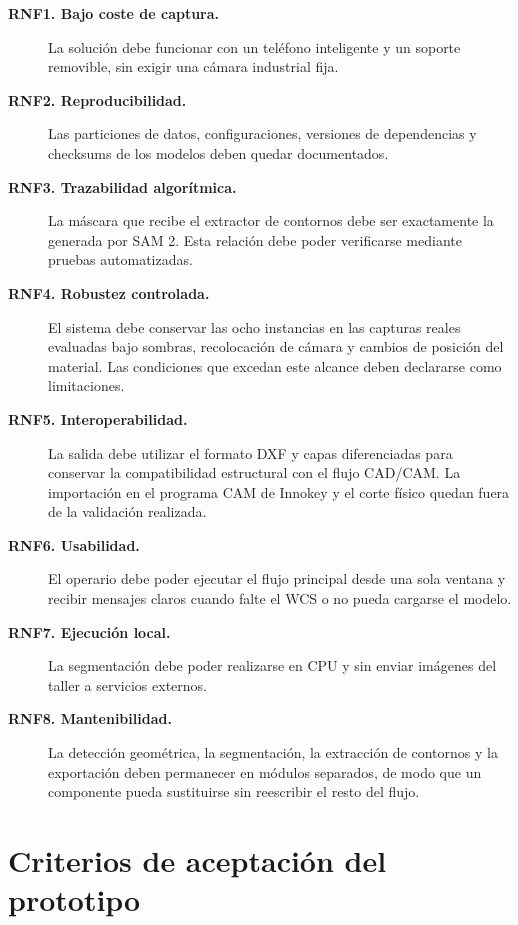 \begin{description}
    \item[\textbf{RNF1. Bajo coste de captura.}] La solución debe funcionar con un teléfono inteligente y un soporte removible, sin exigir una cámara industrial fija.

    \item[\textbf{RNF2. Reproducibilidad.}] Las particiones de datos, configuraciones, versiones de dependencias y checksums de los modelos deben quedar documentados.

    \item[\textbf{RNF3. Trazabilidad algorítmica.}] La máscara que recibe el extractor de contornos debe ser exactamente la generada por SAM 2. Esta relación debe poder verificarse mediante pruebas automatizadas.

    \item[\textbf{RNF4. Robustez controlada.}] El sistema debe conservar las ocho instancias en las capturas reales evaluadas bajo sombras, recolocación de cámara y cambios de posición del material. Las condiciones que excedan este alcance deben declararse como limitaciones.

    \item[\textbf{RNF5. Interoperabilidad.}] La salida debe utilizar el formato DXF y capas diferenciadas para conservar la compatibilidad estructural con el flujo CAD/CAM. La importación en el programa CAM de Innokey y el corte físico quedan fuera de la validación realizada.

    \item[\textbf{RNF6. Usabilidad.}] El operario debe poder ejecutar el flujo principal desde una sola ventana y recibir mensajes claros cuando falte el WCS o no pueda cargarse el modelo.

    \item[\textbf{RNF7. Ejecución local.}] La segmentación debe poder realizarse en CPU y sin enviar imágenes del taller a servicios externos.

    \item[\textbf{RNF8. Mantenibilidad.}] La detección geométrica, la segmentación, la extracción de contornos y la exportación deben permanecer en módulos separados, de modo que un componente pueda sustituirse sin reescribir el resto del flujo.
\end{description}

\section{Criterios de aceptación del prototipo}

